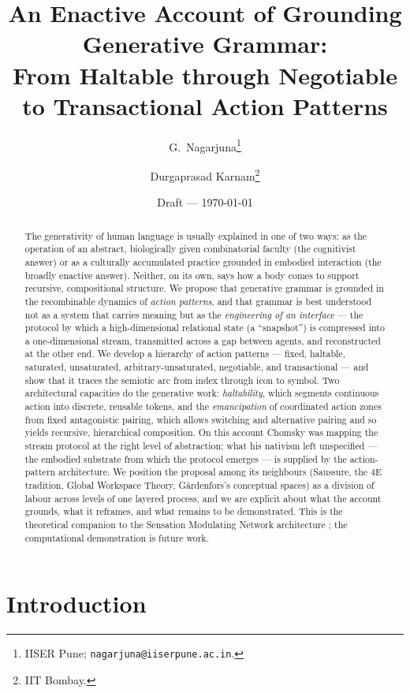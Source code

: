 \documentclass{article}
\title{An Enactive Account of Grounding Generative Grammar:\\
From Haltable through Negotiable to Transactional Action Patterns}
\author{%
  G.~Nagarjuna\thanks{IISER Pune; \texttt{nagarjuna@iiserpune.ac.in}.} \and
  Durgaprasad Karnam\thanks{IIT Bombay.}%
}
\date{Draft --- \today}
\begin{document}
\maketitle

\begin{abstract}
The generativity of human language is usually explained in one of two ways: as the operation of an abstract, biologically given combinatorial faculty (the cognitivist answer) or as a culturally accumulated practice grounded in embodied interaction (the broadly enactive answer). Neither, on its own, says how a body comes to support recursive, compositional structure. We propose that generative grammar is grounded in the recombinable dynamics of \emph{action patterns}, and that grammar is best understood not as a system that carries meaning but as the \emph{engineering of an interface} --- the protocol by which a high-dimensional relational state (a ``snapshot'') is compressed into a one-dimensional stream, transmitted across a gap between agents, and reconstructed at the other end. We develop a hierarchy of action patterns --- fixed, haltable, saturated, unsaturated, arbitrary-unsaturated, negotiable, and transactional --- and show that it traces the semiotic arc from index through icon to symbol. Two architectural capacities do the generative work: \emph{haltability}, which segments continuous action into discrete, reusable tokens, and the \emph{emancipation} of coordinated action zones from fixed antagonistic pairing, which allows switching and alternative pairing and so yields recursive, hierarchical composition. On this account Chomsky was mapping the stream protocol at the right level of abstraction; what his nativism left unspecified --- the embodied substrate from which the protocol emerges --- is supplied by the action-pattern architecture. We position the proposal among its neighbours (Saussure, the 4E tradition, Global Workspace Theory, G\"ardenfors's conceptual spaces) as a division of labour across levels of one layered process, and we are explicit about what the account grounds, what it reframes, and what remains to be demonstrated. This is the theoretical companion to the Sensation Modulating Network architecture \citep{NagarjunaKarnam2026SMN}; the computational demonstration is future work.
\end{abstract}

\section{Introduction}\label{sec:intro}
\end{document}
